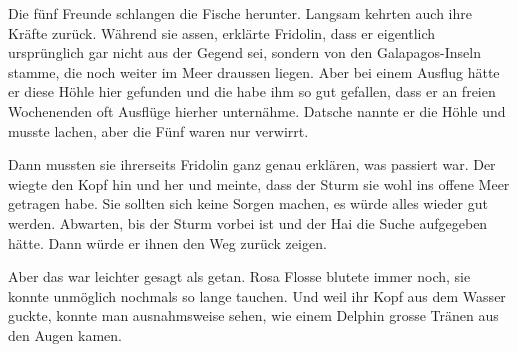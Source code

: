 Die fünf Freunde schlangen die Fische herunter. Langsam kehrten auch ihre Kräfte zurück. Während sie assen, erklärte Fridolin, dass er eigentlich ursprünglich gar nicht aus der Gegend sei, sondern von den Galapagos-Inseln stamme, die noch weiter im Meer draussen liegen. Aber bei einem Ausflug hätte er diese Höhle hier gefunden und die habe ihm so gut gefallen, dass er an freien Wochenenden oft Ausflüge hierher unternähme. Datsche nannte er die Höhle und musste lachen, aber die Fünf waren nur verwirrt. 

Dann mussten sie ihrerseits Fridolin ganz genau erklären, was passiert war. Der wiegte den Kopf hin und her und meinte, dass der Sturm sie wohl ins offene Meer getragen habe. Sie sollten sich keine Sorgen machen, es würde alles wieder gut werden. Abwarten, bis der Sturm vorbei ist und der Hai die Suche aufgegeben hätte. Dann würde er ihnen den Weg zurück zeigen.

Aber das war leichter gesagt als getan. Rosa Flosse blutete immer noch, sie konnte unmöglich nochmals so lange tauchen. Und weil ihr Kopf aus dem Wasser guckte, konnte man ausnahmsweise sehen, wie einem Delphin grosse Tränen aus den Augen kamen.

